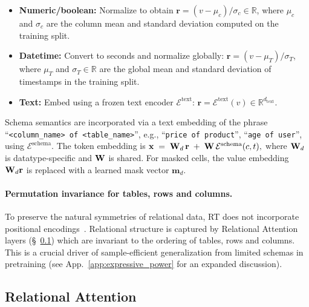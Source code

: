 \begin{itemize}
\item \textbf{Numeric/boolean:} Normalize to obtain $\mathbf{r} = (v - \mu_c)/\sigma_c\in \mathbb{R}$, where $\mu_c$ and $\sigma_c$ are the column mean and standard deviation computed on the training split.
\item \textbf{Datetime:} Convert to seconds and normalize globally: $\mathbf{r} = (v - \mu_T)/\sigma_T$, where $\mu_T$ and $\sigma_T\in \mathbb{R}$ are the global mean and standard deviation of timestamps in the training split.
\item \textbf{Text:} Embed using a frozen text encoder $\mathcal{E}^{\text{text}}$: $\mathbf{r} = \mathcal{E}^{\text{text}}(v) \in \mathbb{R}^{d_{\text{text}}}$.
\end{itemize}

Schema semantics are incorporated via a text embedding of the phrase ``\texttt{<column\_name> of <table\_name>}'',
e.g., ``\texttt{price of product}'', ``\texttt{age of user}'', using $\mathcal{E}^{\text{schema}}$. The token embedding is
$
\mathbf{x} \;=\; {\mathbf{W}}_d\,\mathbf{r} \;+\; {\mathbf{W}}\,\mathcal{E}^{\text{schema}}(c,t),
$
where ${\mathbf{W}}_d$ is datatype-specific and ${\mathbf{W}}$ is shared. For masked cells, the value embedding ${\mathbf{W}}_d{\mathbf{r}}$ is replaced with a learned mask vector $\mathbf{m}_d$.

\paragraph{Permutation invariance for tables, rows and columns.}
To preserve the natural symmetries of relational data,
RT does not incorporate positional encodings~\citep{limsign,huangstability,kanatsoulis2025learning,black2024comparing}.
Relational structure is captured by Relational Attention layers (\S~\ref{subsec:relational_attention})
which are invariant to the ordering of tables, rows and columns.
This is a crucial driver of sample-efficient generalization from limited schemas in pretraining (see App.~\ref{app:expressive_power} for an expanded discussion).

\subsection{Relational Attention}
\label{subsec:relational_attention}

